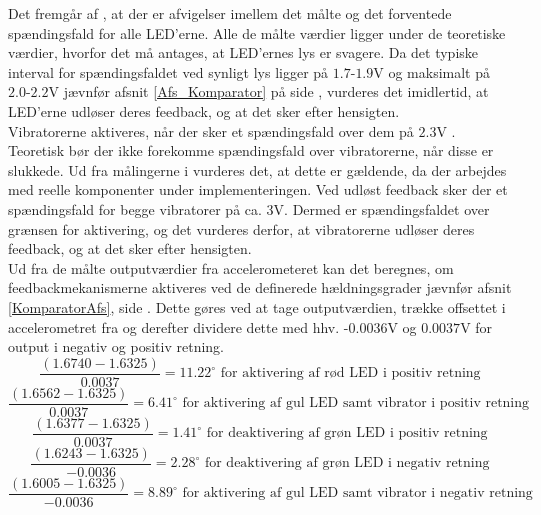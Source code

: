 \noindent Det fremgår af , at der er afvigelser imellem det målte og det forventede spændingsfald for alle LED'erne. Alle de målte værdier ligger under de teoretiske værdier, hvorfor det må antages, at LED'ernes lys er svagere. Da det typiske interval for spændingsfaldet ved synligt lys ligger på $1.7$-$1.9$V og maksimalt på $2.0$-$2.2$V jævnfør afsnit \ref{Afs_Komparator} på side \pageref{Afs_Komparator}, vurderes det imidlertid, at LED'erne udløser deres feedback, og at det sker efter hensigten.\\
Vibratorerne aktiveres, når der sker et spændingsfald over dem på $2.3$V \cite{Machinery2009}. Teoretisk bør der ikke forekomme spændingsfald over vibratorerne, når disse er slukkede. Ud fra målingerne i  vurderes det, at dette er gældende, da der arbejdes med reelle komponenter under implementeringen. Ved udløst feedback sker der et spændingsfald for begge vibratorer på ca. $3$V. Dermed er spændingsfaldet over grænsen for aktivering, og det vurderes derfor, at vibratorerne udløser deres feedback, og at det sker efter hensigten. \\
Ud fra de målte outputværdier fra accelerometeret kan det beregnes, om feedbackmekanismerne aktiveres ved de definerede hældningsgrader jævnfør afsnit \ref{KomparatorAfs}, side \pageref{KomparatorAfs}. Dette gøres ved at tage outputværdien, trække offsettet i accelerometret fra og derefter dividere dette med hhv. -$0.0036$V og $0.0037$V for output i negativ og positiv retning. \\
\begin{equation}\label{eq:graderLED_2}
\dfrac{(1.6740 - 1.6325)}{0.0037} = 11.22^{\circ}\text{ for aktivering af rød LED i positiv retning}
\end{equation}
\begin{equation}
\dfrac{(1.6562 - 1.6325)}{0.0037} = 6.41^{\circ}\text{ for aktivering af gul LED samt vibrator i positiv retning}
\end{equation}
\begin{equation}
\dfrac{(1.6377 - 1.6325)}{0.0037} = 1.41^{\circ}\text{ for deaktivering af grøn LED i positiv retning}
\end{equation}
\begin{equation}
\dfrac{(1.6243 - 1.6325)}{-0.0036} = 2.28^{\circ}\text{ for deaktivering af grøn LED i negativ retning}
\end{equation}
\begin{equation}
\dfrac{(1.6005 - 1.6325)}{-0.0036} = 8.89^{\circ}\text{ for aktivering af gul LED samt vibrator i negativ retning}
\end{equation} 
